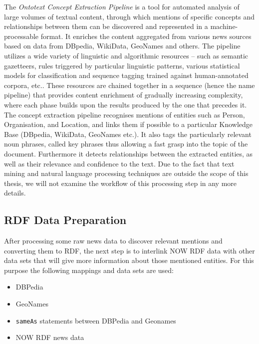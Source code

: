 The \textit{Ontotext Concept Extraction Pipeline} is a tool for automated analysis of large volumes of textual content, through which mentions of specific concepts and relationships between them can be discovered and represented in a machine-processable format. It enriches the content aggregated from various news sources based on data from DBpedia, WikiData, GeoNames and others. The pipeline utilizes a wide variety of linguistic and algorithmic resources – such as semantic gazetteers, rules triggered by particular linguistic patterns, various statistical models for classification and sequence tagging trained against human-annotated corpora, etc.. These resources are chained together in a sequence (hence the name pipeline) that provides content enrichment of gradually increasing complexity, where each phase builds upon the results produced by the one that precedes it. The concept extraction pipeline recognises mentions of entities such as Person, Organisation, and Location, and links them if possible to a particular Knowledge Base (DBpedia, WikiData, GeoNames etc.). It also tags the particularly relevant noun phrases, called key phrases thus allowing a fast grasp into the topic of the document. Furthermore it detects relationships between the extracted entities, as well as their relevance and confidence to the text. Due to the fact that text mining and natural language processing techniques are outside the scope of this thesis, we will not examine the workflow of this processing step in any more details.

\subsection{RDF Data Preparation}
After processing some raw news data to discover relevant mentions and converting them to RDF, the next step is to interlink NOW RDF data with other data sets that will give more information about those mentioned entities. For this purpose the following mappings and data sets are used: 
\begin{itemize}
    \item DBPedia
    \item GeoNames
    \item \verb|sameAs| statements between DBPedia and Geonames
    \item NOW RDF news data
\end{itemize}

